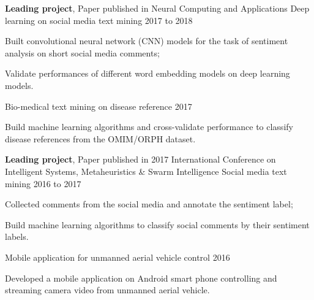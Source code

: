 \begin{cventries}
    \cventry
    {\textbf{Leading project}, Paper published in Neural Computing and Applications} %
    {Deep learning on social media text mining} %
    {} %
    {2017 to 2018} %
    {
      \begin{cvitems} %
        \item Built convolutional neural network (CNN) models for the task of sentiment analysis on short social media comments;
        \item Validate performances of different word embedding models on deep learning models.
      \end{cvitems}
    }
    
    \cventry
    {} %
    {Bio-medical text mining on disease reference} %
    {} %
    {2017} %
    {
      \begin{cvitems} %
        \item Build machine learning algorithms and cross-validate performance to classify disease references from the OMIM/ORPH dataset.
      \end{cvitems}
    }
    
    \cventry
    {\textbf{Leading project}, Paper published in 2017 International Conference on Intelligent Systems, Metaheuristics \& Swarm Intelligence} %
    {Social media text mining} %
    {} %
    {2016 to 2017} %
    {
      \begin{cvitems} %
        \item Collected comments from the social media and annotate the sentiment label;
        \item Build machine learning algorithms to classify social comments by their sentiment labels.
      \end{cvitems}
    }
    
    \cventry
    {} %
    {Mobile application for unmanned aerial vehicle control} %
    {} %
    {2016} %
    {
      \begin{cvitems} %
        \item Developed a mobile application on Android smart phone controlling and  streaming camera video from unmanned aerial vehicle.
      \end{cvitems}
    }    
\end{cventries}